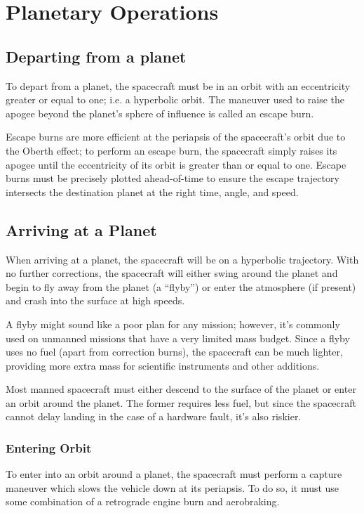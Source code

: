 
\chapter{Planetary Operations}

\section{Departing from a planet}

To depart from a planet, the spacecraft must be in an orbit with an
eccentricity greater or equal to one; i.e. a hyperbolic orbit. The
maneuver used to raise the apogee beyond the planet's sphere of
influence is called an escape burn.

Escape burns are more efficient at the periapsis of the spacecraft's
orbit due to the Oberth effect; to perform an escape burn, the
spacecraft simply raises its apogee until the eccentricity of its
orbit is greater than or equal to one. Escape burns must be precisely
plotted ahead-of-time to ensure the escape trajectory intersects the
destination planet at the right time, angle, and speed.

\section{Arriving at a Planet}

When arriving at a planet, the spacecraft will be on a hyperbolic
trajectory. With no further corrections, the spacecraft will either
swing around the planet and begin to fly away from the planet (a
``flyby'') or enter the atmosphere (if present) and crash into the
surface at high speeds.

A flyby might sound like a poor plan for any mission; however, it's
commonly used on unmanned missions that have a very limited mass
budget. Since a flyby uses no fuel (apart from correction burns), the
spacecraft can be much lighter, providing more extra mass for
scientific instruments and other additions.

Most manned spacecraft must either descend to the surface of the
planet or enter an orbit around the planet. The former requires less
fuel, but since the spacecraft cannot delay landing in the case of a
hardware fault, it's also riskier.

\subsection{Entering Orbit}

To enter into an orbit around a planet, the spacecraft must perform a
capture maneuver which slows the vehicle down at its periapsis. To do
so, it must use some combination of a retrograde engine burn and
aerobraking.

